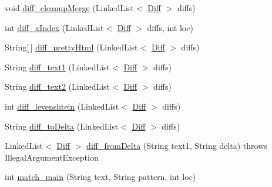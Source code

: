 \begin{DoxyCompactItemize}
void \hyperlink{classname_1_1fraser_1_1neil_1_1plaintext_1_1diff__match__patch_a9949a1ab7e365563313511f9f91f8589}{diff\+\_\+cleanup\+Merge} (Linked\+List$<$ \hyperlink{classname_1_1fraser_1_1neil_1_1plaintext_1_1diff__match__patch_1_1Diff}{Diff} $>$ diffs)
\item 
int \hyperlink{classname_1_1fraser_1_1neil_1_1plaintext_1_1diff__match__patch_ad286544b61bbb6e28a9c1725cc350356}{diff\+\_\+x\+Index} (Linked\+List$<$ \hyperlink{classname_1_1fraser_1_1neil_1_1plaintext_1_1diff__match__patch_1_1Diff}{Diff} $>$ diffs, int loc)
\item 
String\mbox{[}$\,$\mbox{]} \hyperlink{classname_1_1fraser_1_1neil_1_1plaintext_1_1diff__match__patch_ae82655bb5a90a0cba48f0c49b30eee5d}{diff\+\_\+pretty\+Html} (Linked\+List$<$ \hyperlink{classname_1_1fraser_1_1neil_1_1plaintext_1_1diff__match__patch_1_1Diff}{Diff} $>$ diffs)
\item 
String \hyperlink{classname_1_1fraser_1_1neil_1_1plaintext_1_1diff__match__patch_a592db3ccd9982819324232bfc2bc8c0a}{diff\+\_\+text1} (Linked\+List$<$ \hyperlink{classname_1_1fraser_1_1neil_1_1plaintext_1_1diff__match__patch_1_1Diff}{Diff} $>$ diffs)
\item 
String \hyperlink{classname_1_1fraser_1_1neil_1_1plaintext_1_1diff__match__patch_adf7770a23e9261a00e446eb86b3881a8}{diff\+\_\+text2} (Linked\+List$<$ \hyperlink{classname_1_1fraser_1_1neil_1_1plaintext_1_1diff__match__patch_1_1Diff}{Diff} $>$ diffs)
\item 
int \hyperlink{classname_1_1fraser_1_1neil_1_1plaintext_1_1diff__match__patch_a16beed634210b858ea8980b3fc8b4abf}{diff\+\_\+levenshtein} (Linked\+List$<$ \hyperlink{classname_1_1fraser_1_1neil_1_1plaintext_1_1diff__match__patch_1_1Diff}{Diff} $>$ diffs)
\item 
String \hyperlink{classname_1_1fraser_1_1neil_1_1plaintext_1_1diff__match__patch_ae2ef3167053001db050dee4b6815fda3}{diff\+\_\+to\+Delta} (Linked\+List$<$ \hyperlink{classname_1_1fraser_1_1neil_1_1plaintext_1_1diff__match__patch_1_1Diff}{Diff} $>$ diffs)
\item 
Linked\+List$<$ \hyperlink{classname_1_1fraser_1_1neil_1_1plaintext_1_1diff__match__patch_1_1Diff}{Diff} $>$ \hyperlink{classname_1_1fraser_1_1neil_1_1plaintext_1_1diff__match__patch_a46e4e291d628ce1c46d6cf1ac20d5f9f}{diff\+\_\+from\+Delta} (String text1, String delta)  throws Illegal\+Argument\+Exception 
\item 
int \hyperlink{classname_1_1fraser_1_1neil_1_1plaintext_1_1diff__match__patch_acc3ac98d9a2785b621d177b8edc3d037}{match\+\_\+main} (String text, String pattern, int loc)

\end{DoxyCompactItemize}
